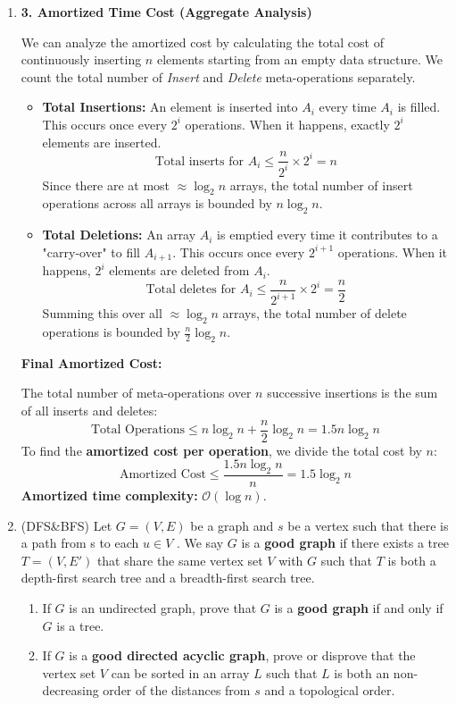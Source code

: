 \documentclass[12pt,a4paper]{article}
\makeatletter
\newtheorem*{solution}{Solution}
\theoremstyle{definition}
\renewenvironment{solution}[1][Solution] {\par\pushQED{\qed}\normalfont\topsep6\p@\@plus6\p@\relax\trivlist\item[\hskip\labelsep\bfseries#1\@addpunct{.}]\ignorespaces}{\popQED\endtrivlist\@endpefalse} \makeatother
\makeatother
\begin{document}
\begin{enumerate}
\begin{solution}
\textbf{3. Amortized Time Cost (Aggregate Analysis)}

We can analyze the amortized cost by calculating the total cost of continuously inserting $n$ elements starting from an empty data structure. We count the total number of \textit{Insert} and \textit{Delete} meta-operations separately.

\begin{itemize}
    \item \textbf{Total Insertions:} An element is inserted into $A_i$ every time $A_i$ is filled. This occurs once every $2^i$ operations. When it happens, exactly $2^i$ elements are inserted. 
    $$ \text{Total inserts for } A_i \le \frac{n}{2^i} \times 2^i = n $$
    Since there are at most $\approx \log_2 n$ arrays, the total number of insert operations across all arrays is bounded by $n \log_2 n$.
    
    \item \textbf{Total Deletions:} An array $A_i$ is emptied every time it contributes to a "carry-over" to fill $A_{i+1}$. This occurs once every $2^{i+1}$ operations. When it happens, $2^i$ elements are deleted from $A_i$.
    $$ \text{Total deletes for } A_i \le \frac{n}{2^{i+1}} \times 2^i = \frac{n}{2} $$
    Summing this over all $\approx \log_2 n$ arrays, the total number of delete operations is bounded by $\frac{n}{2} \log_2 n$.
\end{itemize}

\textbf{Final Amortized Cost:}

The total number of meta-operations over $n$ successive insertions is the sum of all inserts and deletes:
$$ \text{Total Operations} \le n \log_2 n + \frac{n}{2} \log_2 n = 1.5n \log_2 n $$
To find the \textbf{amortized cost per operation}, we divide the total cost by $n$:
$$ \text{Amortized Cost} \le \frac{1.5n \log_2 n}{n} = 1.5 \log_2 n $$
\textbf{Amortized time complexity:} $\mathcal{O}(\log n)$.
    \end{solution}

   \item {\color{purple}(DFS\&BFS)} Let $G = (V, E)$ be a graph and $s$ be a vertex such that there is a path from s to each $u \in V$ . We say $G$ is a \textbf{good graph} if there exists a tree $T = (V, E′)$ that share the same vertex set $V$ with $G$ such that $T$ is both a depth-first search tree and a breadth-first  search tree.
    \begin{enumerate}
        \item If $G$ is an undirected graph, prove that $G$ is a \textbf{good graph} if and only if $G$ is a tree.
        \item If $G$ is a \textbf{good directed acyclic graph}, prove or disprove that the vertex set $V$ can be sorted in an array $L$ such that $L$ is both an non-decreasing order of the distances from $s$ and a topological order.
    \end{enumerate}


\end{enumerate}
\end{document}

